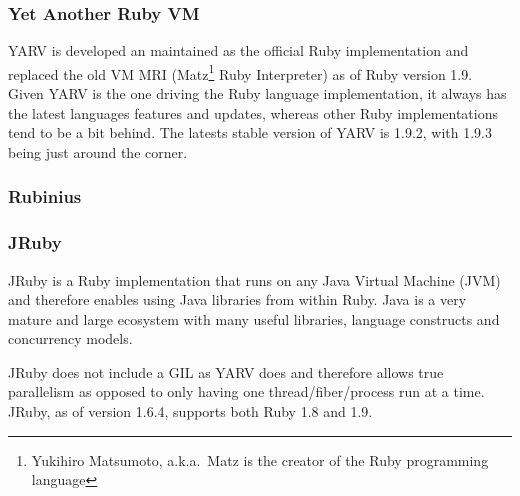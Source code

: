 \subsubsection{Yet Another Ruby VM}
YARV is developed an maintained as the official Ruby implementation and replaced
the old VM MRI (Matz\footnote{Yukihiro Matsumoto, a.k.a.\ Matz is the creator of 
the Ruby programming language} Ruby Interpreter) as of Ruby version 1.9. Given
YARV is the one driving the Ruby language implementation, it always has the
latest languages features and updates, whereas other Ruby implementations tend
to be a bit behind. The latests stable version of YARV is 1.9.2, with 1.9.3
being just around the corner.

\subsubsection{Rubinius}

\subsubsection{JRuby}
JRuby is a Ruby implementation that runs on any Java Virtual Machine (JVM)
and therefore enables using Java libraries from within Ruby. Java is a very
mature and large ecosystem with many useful libraries, language constructs and
concurrency models.

JRuby does not include a GIL as YARV does and therefore allows true
parallelism as opposed to only having one thread/fiber/process run at a time.
JRuby, as of version 1.6.4, supports both Ruby 1.8 and 1.9.



